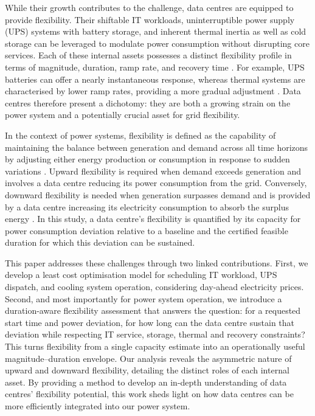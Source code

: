 \documentclass[lettersize,journal]{IEEEtran}
\providecommand{\DIFadd}[1]{{\color{blue}#1}}
\providecommand{\DIFaddbegin}{}
\providecommand{\DIFaddend}{}
\begin{document}
While their growth contributes to the challenge, data centres are equipped to provide flexibility. Their shiftable IT workloads, uninterruptible power supply (UPS) systems with battery storage, and inherent thermal inertia as well as cold storage  can be leveraged to modulate power consumption without disrupting core services. Each of these internal assets possesses a distinct flexibility profile in terms of magnitude, duration, ramp rate, and recovery time \cite{zhang2025unlocking}. For example, UPS batteries can offer a near\DIFaddbegin \DIFadd{ly}\DIFaddend{}  instantaneous response, whereas thermal systems are characterised by lower ramp rates, providing a more gradual adjustment \cite{zhang2025unlocking, alapera2018data}. Data centres therefore present a dichotomy\DIFaddbegin \DIFadd{: }\DIFaddend they are both a growing strain on the power system and a potentially crucial asset for grid flexibility.

In the context of power systems, flexibility is defined as the capability of maintaining the balance between generation and demand across all time horizons  by adjusting either energy production or consumption in response to sudden variations \cite{Centrica2020LEM, EEAACER2023Flex, neso2025future, Nosair2015TSTE}. Upward flexibility is required when demand exceeds generation and involves a  \DIFaddbegin \DIFadd{data centre }\DIFaddend reducing its power consumption from the grid. Conversely, downward flexibility is needed when generation surpasses demand  and is provided by a  \DIFaddbegin \DIFadd{data centre }\DIFaddend increasing its electricity consumption to absorb the surplus energy \cite{Centrica2020LEM, NG2017SNAPS}. In this study, a data centre's flexibility is quantified by its capacity for power consumption deviation relative to a baseline  \DIFaddbegin \DIFadd{and the certified feasible }\DIFaddend duration for which this deviation can be sustained.

This paper addresses these challenges through two  \DIFaddbegin \DIFadd{linked }\DIFaddend contributions. First, we develop a least cost optimisation model for scheduling IT workload, UPS dispatch, and cooling system operation, considering day-ahead electricity prices. Second, \DIFaddbegin \DIFadd{and most importantly for power system operation, }\DIFaddend we introduce a  \DIFaddbegin \DIFadd{duration-aware flexibility assessment that answers the question: for a requested start time and power deviation, for how long can the data centre sustain that deviation while respecting IT service, storage, thermal and recovery constraints? This turns flexibility from a single capacity estimate into an operationally useful magnitude--duration envelope}\DIFaddend . Our analysis reveals the asymmetric nature of upward and downward flexibility, detailing the distinct roles of each internal asset. By providing a method to develop an in-depth understanding of data centres' flexibility potential, this work sheds light on how data centres can be more efficiently integrated into our power system.
\end{document}
